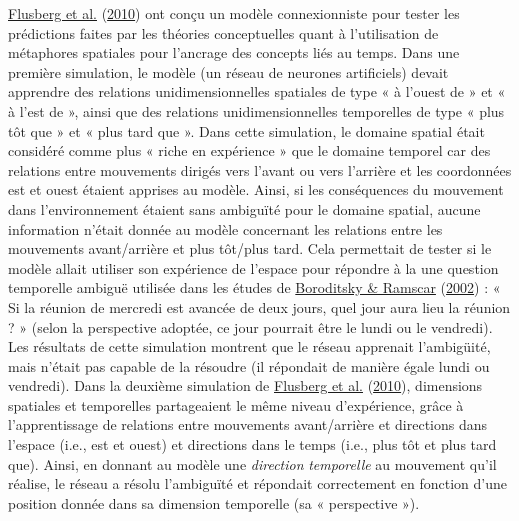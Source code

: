 \documentclass[
  a4paper,12pt,twoside,onecolumn,openright,final,oldfontcommands]{memoir}
\begin{document}
\protect\hyperlink{ref-flusberg_connectionist_2010}{Flusberg et al.} (\protect\hyperlink{ref-flusberg_connectionist_2010}{2010}) ont conçu un modèle connexionniste pour tester les prédictions faites par les théories conceptuelles quant à l'utilisation de métaphores spatiales pour l'ancrage des concepts liés au temps. Dans une première simulation, le modèle (un réseau de neurones artificiels) devait apprendre des relations unidimensionnelles spatiales de type « à l'ouest de » et « à l'est de », ainsi que des relations unidimensionnelles temporelles de type « plus tôt que » et « plus tard que ». Dans cette simulation, le domaine spatial était considéré comme plus « riche en expérience » que le domaine temporel car des relations entre mouvements dirigés vers l'avant ou vers l'arrière et les coordonnées est et ouest étaient apprises au modèle. Ainsi, si les conséquences du mouvement dans l'environnement étaient sans ambiguïté pour le domaine spatial, aucune information n'était donnée au modèle concernant les relations entre les mouvements avant/arrière et plus tôt/plus tard. Cela permettait de tester si le modèle allait utiliser son expérience de l'espace pour répondre à la une question temporelle ambiguë utilisée dans les études de \protect\hyperlink{ref-boroditsky_roles_2002}{Boroditsky \& Ramscar} (\protect\hyperlink{ref-boroditsky_roles_2002}{2002}) : « Si la réunion de mercredi est avancée de deux jours, quel jour aura lieu la réunion ? » (selon la perspective adoptée, ce jour pourrait être le lundi ou le vendredi). Les résultats de cette simulation montrent que le réseau apprenait l'ambigüité, mais n'était pas capable de la résoudre (il répondait de manière égale lundi ou vendredi). Dans la deuxième simulation de \protect\hyperlink{ref-flusberg_connectionist_2010}{Flusberg et al.} (\protect\hyperlink{ref-flusberg_connectionist_2010}{2010}), dimensions spatiales et temporelles partageaient le même niveau d'expérience, grâce à l'apprentissage de relations entre mouvements avant/arrière et directions dans l'espace (i.e., est et ouest) et directions dans le temps (i.e., plus tôt et plus tard que). Ainsi, en donnant au modèle une \emph{direction} \emph{temporelle} au mouvement qu'il réalise, le réseau a résolu l'ambiguïté et répondait correctement en fonction d'une position donnée dans sa dimension temporelle (sa « perspective »).
\end{document}
